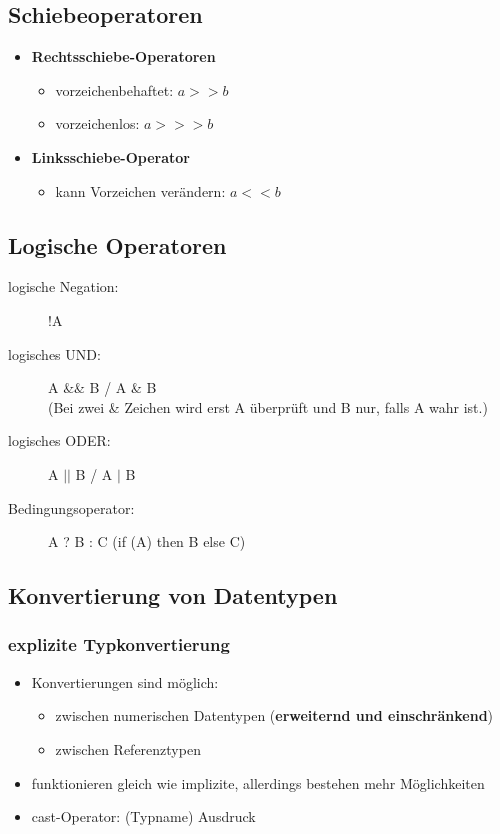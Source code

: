 \documentclass[a4paper,10pt]{article}
\newcommand{\Bold}[1]{\textbf{#1}} %
\begin{document}
\subsection{Schiebeoperatoren}
\begin{itemize}
	\item \Bold {Rechtsschiebe-Operatoren}
		\begin{itemize}
			\item vorzeichenbehaftet: $a >> b$
			\item vorzeichenlos: $a >>> b$
		\end{itemize}
	\item \Bold {Linksschiebe-Operator}
		\begin{itemize}
			\item kann Vorzeichen ver\"andern:  $a << b$
		\end{itemize}
\end{itemize}

\subsection{Logische Operatoren}
\begin{description}
	\item[logische Negation:] !A
	\item[logisches UND:] A \&\& B  / A \& B \\
				(Bei zwei \& Zeichen wird erst A \"uberpr\"uft und B nur, falls A wahr ist.)
	\item[logisches ODER:] A $||$ B / A $|$ B
	\item[Bedingungsoperator:] A ? B : C (if (A) then B else C)
\end{description}

\subsection{Konvertierung von Datentypen}

\subsubsection{explizite Typkonvertierung}
\begin{itemize}
	\item Konvertierungen sind m\"oglich:
		\begin{itemize}
			\item zwischen numerischen Datentypen (\Bold {erweiternd und einschr\"ankend})
			\item zwischen Referenztypen
		\end{itemize}
	\item funktionieren gleich wie implizite, allerdings bestehen mehr M\"oglichkeiten
	\item cast-Operator: (Typname) Ausdruck
\end{itemize}
\end{document}
